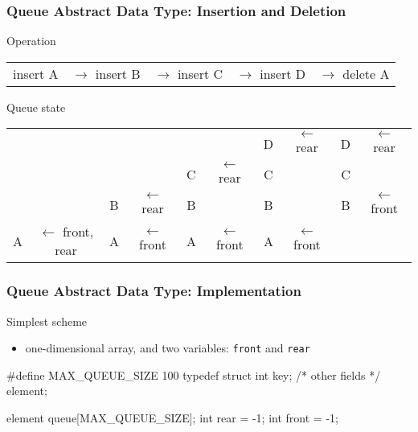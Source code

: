 \documentclass[newPxFont,sthlmFooter,nooffset]{beamer}
\begin{document}
\begin{frame}[t]
  \frametitle{Queue Abstract Data Type:  Insertion and Deletion}

Operation
{\footnotesize  \begin{centering}
\begin{tabular}{!{}c<{}c<{}c<{}c<{}c}
insert A & $\rightarrow$ insert B &  $\rightarrow$ insert C &  $\rightarrow$ insert D &  $\rightarrow$ delete A  \\
    \end{tabular}
  \end{centering}}

{ Queue state}

{\footnotesize  \begin{centering}
\begin{tabular}{!{} c<{}c<{}c<{}c<{}c<{}c<{}c<{}c<{}c<{}c}
       &                   &   &  &   &  & D & $\leftarrow$ rear & D & $\leftarrow$ rear \\
       &                   &   &  & C & $\leftarrow$ rear & C &  & C & \\
       &                   & B & $\leftarrow$ rear & B &  & B &  & B & $\leftarrow$ front\\
     A & $\leftarrow$ front, rear & A & $\leftarrow$ front & A & $\leftarrow$ front & A & $\leftarrow$ front &  & \\
    \end{tabular}
  \end{centering}}
\end{frame}

\begin{frame}[t, fragile]
  \frametitle{Queue Abstract Data Type: Implementation}
Simplest scheme
\begin{itemize}
\item one-dimensional array, and two variables: \texttt{front} and \texttt{rear}
\end{itemize}

\begin{ncodedef}
#define MAX_QUEUE_SIZE 100  
typedef struct {
    int key;
    /* other fields */
} element;

element queue[MAX_QUEUE_SIZE];
int rear = -1;
int front = -1;
\end{ncodedef}
\end{frame}
\end{document}
